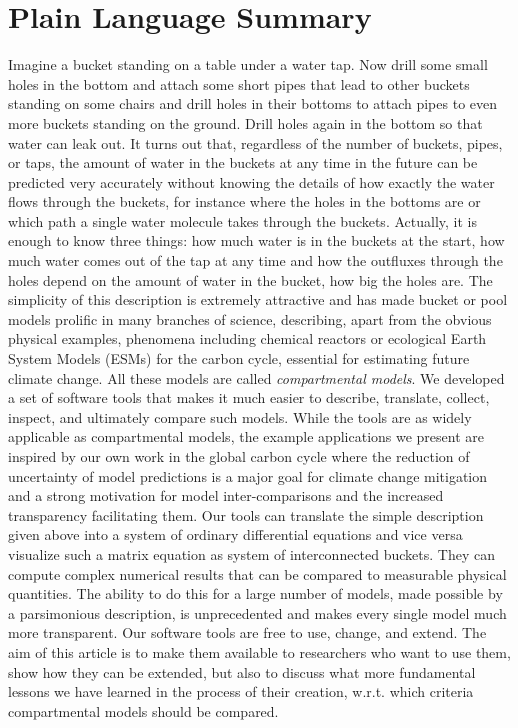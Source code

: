 \section*{Plain Language Summary} 
Imagine a bucket standing on a table under a water tap. Now drill some small
holes in the bottom and attach some short pipes that lead to other buckets
standing on some chairs and drill holes in their bottoms to attach pipes to even
more buckets standing on the ground. Drill holes again in the bottom so that
water can leak out. It turns out that, regardless of the number of buckets,
pipes, or taps, the amount of water in the buckets at any time in the future can
be predicted very accurately without knowing the details of how exactly the
water flows through the buckets, for instance where the holes in the bottoms are
or which path a single water molecule takes through the buckets.  Actually, it is
enough to know three things: how much water is in the buckets at the start, how
much water comes out of the tap at any time and how the outfluxes through the
holes depend on the amount of water in the bucket, \ie how big the holes are.
The simplicity of this description is extremely attractive and has made bucket
or pool models prolific in many branches of science, describing, apart from the
obvious physical examples, phenomena including  chemical reactors or
ecological Earth System Models (ESMs) for the carbon cycle, essential for estimating
future climate change.  All these models are called \emph{compartmental
models}.  We developed a set of software tools that makes it much easier to
describe, translate, collect, inspect, and ultimately compare such models.
While the tools are as widely applicable as compartmental models, the example
applications we present are inspired by our own work in the global carbon cycle
where the reduction of uncertainty of model predictions is a major goal for
climate change mitigation and a strong motivation for model inter-comparisons
and the increased transparency facilitating them.  Our tools can translate the
simple description given above into a system of ordinary differential equations
and vice versa visualize such a matrix  equation as system of interconnected
buckets. They can compute complex numerical results that can be compared to 
measurable physical quantities.  The ability to do this for a
large number of models, made possible by a parsimonious description, is
unprecedented and makes every single model much more transparent.  Our software
tools are free to use, change, and extend.  The aim of this article is to make
them available to researchers who want to use them, show how they can
be extended, but also to discuss what more fundamental lessons we have learned
in the process of their creation, \eg w.r.t. which criteria compartmental models
should be compared.
%
%

